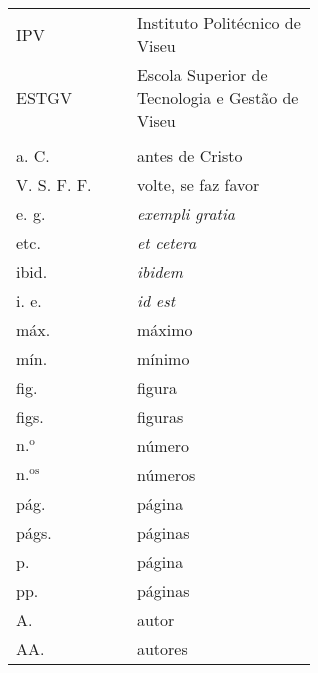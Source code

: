 \begin{flushleft}
\begin{tabular}{l p{0.6\linewidth}}
IPV      & Instituto Politécnico de Viseu\\
ESTGV    & Escola Superior de Tecnologia e Gestão de Viseu\\
\\
a. C.       & antes de Cristo\\
V. S. F. F. & volte, se faz favor\\
e. g.       & \textit{exempli gratia}\\
etc.        & \textit{et cetera}\\
ibid.       & \textit{ibidem}\\
i. e.       & \textit{id est}\\
máx.        & máximo\\
mín.        & mínimo\\
fig.        & figura\\
figs.       & figuras\\
$\text{n.}^{\text{o}}$  & número\\
$\text{n.}^{\text{os}}$ & números\\
pág.        & página\\
págs.       & páginas\\
p.          & página\\
pp.         & páginas\\
A.          & autor\\
AA.         & autores
\end{tabular}
\end{flushleft}